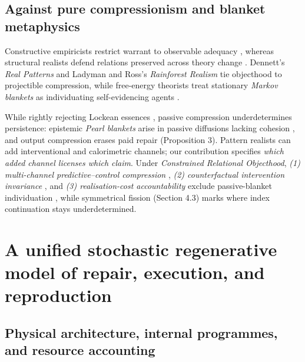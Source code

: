 \documentclass[12pt,letterpaper]{article}
\begin{document}
\subsection{Against pure compressionism and blanket
metaphysics}\label{against-pure-compressionism-and-blanket-metaphysics}

Constructive empiricists restrict warrant to observable adequacy
\citep{vanFraassen1980}, whereas structural realists defend relations
preserved across theory change \citep{worrall1989, ladyman1998}.
Dennett's \citeyearpar{dennett1991} \emph{Real Patterns} and Ladyman and
Ross's \citeyearpar{ladymanRoss2007} \emph{Rainforest Realism} tie
objecthood to projectible compression, while free-energy theorists treat
stationary \emph{Markov blankets} as individuating self-evidencing
agents \citep{friston2013, parrPezzuloFriston2022}.

While rightly rejecting Lockean essences
\citep{whitehead1929, dupre1993, dupreNicholson2018}, passive
compression underdetermines persistence: epistemic \emph{Pearl blankets}
arise in passive diffusions lacking cohesion
\citep{raja2021, bruineberg2022, biehl2021}, and output compression
erases paid repair (Proposition 3). Pattern realists
\citep{dennett1991, ladymanRoss2007} can add interventional and
calorimetric channels; our contribution specifies \emph{which added
channel licenses which claim}. Under \emph{Constrained Relational
Objecthood}, \emph{(1) multi-channel predictive--control compression}
\citep{wimsatt2007}, \emph{(2) counterfactual intervention invariance}
\citep{hacking1983, woodward2003, craver2007}, and \emph{(3)
realisation-cost accountability}
\citep{jonas1966, rosen1991, montevilMossio2015} exclude passive-blanket
individuation \citep{cartwright1999}, while symmetrical fission (Section
4.3) marks where index continuation stays underdetermined.

\section{A unified stochastic regenerative model of repair, execution,
and
reproduction}\label{a-unified-stochastic-regenerative-model-of-repair-execution-and-reproduction}

\subsection{Physical architecture, internal programmes, and resource
accounting}\label{physical-architecture-internal-programmes-and-resource-accounting}
\end{document}
